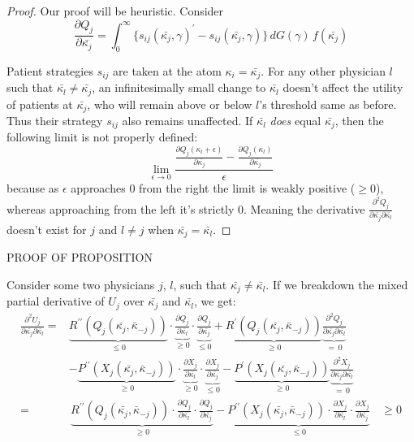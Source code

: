 \documentclass[../main.tex]{subfiles}
\begin{document}
\begin{proof}
Our proof will be heuristic. Consider
 \[
    \frac{\partial Q_{j}}{\partial\bar{\kappa_{j}}} = \int_{0}^{\infty} \{ {s_{ij}} (\bar{\kappa_j}, \gamma)^{\prime} - s_{ij} (\bar{\kappa_j}, \gamma)\} \,dG(\gamma) \,f(\bar{\kappa_j})
 \]

Patient strategies $s_{ij}$ are taken at the atom $\kappa_i = \bar{\kappa_j}$. For any other physician $l$ such that $\bar{\kappa_l} \neq \bar{\kappa_j}$, an infinitesimally small change to $\bar{\kappa_l}$ doesn't affect the utility of patients at $\bar{\kappa_j}$, who will remain above or below $l$'s threshold same as before. Thus their strategy $s_{ij}$ also remains unaffected. If $\bar{\kappa_l}$ \textit{does} equal $\bar{\kappa_j}$, then the following limit is not properly defined:
\[
    \lim_{\epsilon \rightarrow 0} \frac{ \frac{\partial Q_{j}(\kappa_l + \epsilon)}{\partial\bar{\kappa_{j}}} - \frac{\partial Q_{j}(\kappa_l ) }{\partial\bar{\kappa_{j}}}   }{\epsilon}
\]
because as $\epsilon$ approaches $0$ from the right the limit is weakly positive ($\geq 0$), whereas approaching from the left it's strictly $0$. Meaning the derivative $\frac{\partial^2 Q_{j}}{\partial\bar{\kappa_{j}} \partial\bar{\kappa_{l}}}$ doesn't exist for $j$ and $l \neq j$ when $\bar{\kappa_j}=\bar{\kappa_l}$.

\end{proof}

PROOF OF PROPOSITION

Consider some two physicians $j$, $l$, such that $\bar{\kappa_j} \neq \bar{\kappa_l}$. If we breakdown the mixed partial derivative of $U_j$ over $\bar{\kappa_j}$ and $\bar{\kappa_l}$, we get:
\begin{align*}
\frac{\partial^2 U_{j}}{\partial\bar{\kappa_{j}} \partial\bar{\kappa_{l}}} = & 
\underbrace{R^{\prime \prime}(Q_j(\bar{\kappa_j}, \bar{\kappa}_{-j}))}_{\leq 0}
\cdot \underbrace{\frac{\partial Q_{j}}{\partial\bar{\kappa_{l}}}}_{\geq 0}
\cdot \underbrace{\frac{\partial Q_{j}}{\partial\bar{\kappa_{j}}}}_{\leq 0}  + 
\underbrace{R^{\prime} (Q_j(\bar{\kappa_j}, \bar{\kappa}_{-j}))}_{\geq 0} \underbrace{\frac{\partial^2 Q_{j}}{{\partial\bar{\kappa_{j}} \partial\bar{\kappa_{l}}}}}_{= \, 0} & \\
 & - \underbrace{P^{\prime \prime} (X_j(\bar{\kappa_j}, \bar{\kappa}_{-j}))}_{\geq 0}
\cdot \underbrace{\frac{\partial X_{j}}{\partial\bar{\kappa_{l}}}}_{\geq 0}
\cdot \underbrace{\frac{\partial X_{j}}{\partial\bar{\kappa_{j}}}}_{\leq 0}  - 
\underbrace{P^{\prime} (X_j(\bar{\kappa_j}, \bar{\kappa}_{-j}))}_{\geq 0} \underbrace{\frac{\partial^2 X_{j}}{\partial\bar{\kappa_{j}} \partial\bar{\kappa_{l}}}}_{= \, 0} &  \\
    = & \, \underbrace{{R^{\prime \prime}} (Q_j(\bar{\kappa_j}, \bar{\kappa}_{-j}))
    \cdot \frac{\partial Q_{j}}{\partial\bar{\kappa_{l}}}
    \cdot \frac{\partial Q_{j}}{\partial\bar{\kappa_{j}}}}_{\geq 0}  -
    \underbrace{P^{\prime \prime} (X_j(\bar{\kappa_j}, \bar{\kappa}_{-j}))
    \cdot \frac{\partial X_{j}}{\partial\bar{\kappa_{l}}}
    \cdot \frac{\partial X_{j}}{\partial\bar{\kappa_{j}}}}_{\leq 0} \, & \geq 0
\end{align*}
\end{document}
